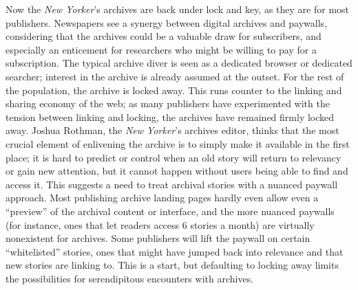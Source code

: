 Now the \emph{New Yorker}'s archives are back under lock and key, as they are for most publishers. Newspapers see a synergy between digital archives and paywalls, considering that the archives could be a valuable draw for subscribers, and especially an enticement for researchers who might be willing to pay for a subscription. The typical archive diver is seen as a dedicated browser or dedicated searcher; interest in the archive is already assumed at the outset. For the rest of the population, the archive is locked away. This runs counter to the linking and sharing economy of the web; as many publishers have experimented with the tension between linking and locking, the archives have remained firmly locked away. Joshua Rothman, the \emph{New Yorker}'s archives editor, thinks that the most crucial element of enlivening the archive is to simply make it available in the first place; it is hard to predict or control when an old story will return to relevancy or gain new attention, but it cannot happen without users being able to find and access it.\autocite{interview with josh rothman} This suggests a need to treat archival stories with a nuanced paywall approach. Most publishing archive landing pages hardly even allow even a ``preview'' of the archival content or interface, and the more nuanced paywalls (for instance, ones that let readers access 6 stories a month) are virtually nonexistent for archives. Some publishers will lift the paywall on certain ``whitelisted'' stories, ones that might have jumped back into relevance and that new stories are linking to.\autocite{interview with lily rothman} This is a start, but defaulting to locking away limits the possibilities for serendipitous encounters with archives.

